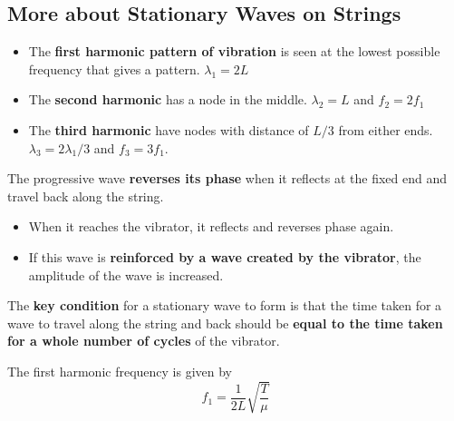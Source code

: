\subsection{More about Stationary Waves on Strings}

\begin{itemize}
    \item The \textbf{first harmonic pattern of vibration} is seen at the lowest possible frequency that gives a pattern. $\lambda_1=2L$
    \item The \textbf{second harmonic} has a node in the middle. $\lambda_2=L$ and $f_2=2f_1$
    \item The \textbf{third harmonic} have nodes with distance of $L/3$ from either ends. $\lambda_3=2\lambda_1/3$ and $f_3=3f_1$.
\end{itemize}

The progressive wave \textbf{reverses its phase} when it reflects at the fixed end and travel back along the string.
\begin{itemize}
    \item When it reaches the vibrator, it reflects and reverses phase again.
    \item If this wave is \textbf{reinforced by a wave created by the vibrator}, the amplitude of the wave is increased.
\end{itemize}
The \textbf{key condition} for a stationary wave to form is that the time taken for a wave to travel along the string and back should be \textbf{equal to the time taken for a whole number of cycles} of the vibrator.

The first harmonic frequency is given by
$$f_1=\frac{1}{2L}\sqrt{\frac{T}{\mu}}$$
